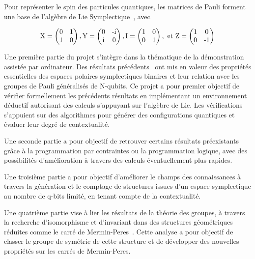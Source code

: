 \documentclass[10pt, a4paper, french]{article}
\begin{document}
Pour représenter le spin des particules quantiques, les matrices de Pauli forment une base de l'algèbre de Lie Symplectique~\cite{7110927}, avec

\begin{gather}
 \text{X}
 =
  \begin{pmatrix}
   $0$ & $1$ \\
   $1$ & $0$ 
   \end{pmatrix}, 
   \text{Y}
 =
  \begin{pmatrix}
   $0$ & $-i$ \\
   $i$ & $0$ 
   \end{pmatrix}, 
   \text{I}
 =
  \begin{pmatrix}
   $1$ & $0$ \\
   $0$ & $1$ 
   \end{pmatrix},
   \text{ et Z}=
  \begin{pmatrix}
   $1$ & $0$ \\
   $0$ & $-1$ 
   \end{pmatrix}
\end{gather}

Une première partie du projet s'intègre dans la thématique de la démonstration assistée par ordinateur.  Des résultats précédents~\cite{MULLER2022101853, contextAG}  ont mis en valeur des propriétés essentielles des espaces polaires symplectiques binaires et leur relation avec les groupes de Pauli généralisés de N-qubits. Ce projet a pour premier objectif de vérifier formellement les précédents résultats en implémentant un environnement déductif autorisant des calculs s'appuyant sur l'algèbre de Lie.
Les vérifications s'appuient sur des algorithmes pour générer des configurations quantiques et évaluer leur degré de contextualité.  

Une seconde partie a pour objectif de retrouver certains résultats préexistants~\cite{MULLER2022101853, contextAG} grâce à la programmation par contraintes ou la programmation logique, avec des possibilités d'amélioration à travers des calculs éventuellement plus rapides.

Une troisième partie a pour objectif d'améliorer le champs des connaissances à travers la génération et le comptage de structures issues d'un espace symplectique au nombre de q-bits limité, en tenant compte de la contextualité.

Une quatrième partie vise à lier les résultats de la théorie des groupes, à travers la recherche d'isomorphisme et d'invariant dans des structures géométriques réduites comme le carré de Mermin-Peres~\cite{mermin1993hidden}. Cette analyse a pour objectif de classer le groupe de symétrie de cette structure et de développer des nouvelles propriétés sur les carrés de Mermin-Peres. 
\end{document}
